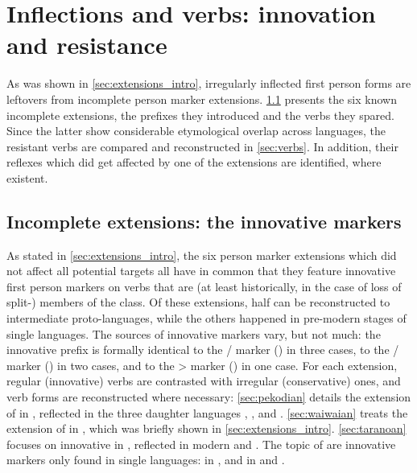 \section{Inflections and verbs: innovation and resistance}
\label{sec:data}
As was shown in \cref{sec:extensions_intro}, irregularly inflected first person forms are leftovers from incomplete person marker extensions.
\cref{sec:extensions} presents the six known incomplete extensions, the prefixes they introduced and the verbs they spared.
Since the latter show considerable etymological overlap across languages, the resistant verbs are compared and reconstructed in \cref{sec:verbs}.
In addition, their reflexes which did get affected by one of the extensions are identified, where existent.

\subsection{Incomplete extensions: the innovative \texorpdfstring{}{Sa} markers}
\label{sec:extensions}
As stated in \cref{sec:extensions_intro}, the six person marker extensions which did not affect all potential targets all have in common that they feature innovative first person markers on verbs that are (at least historically, in the case of loss of split-) members of the  class.
Of these extensions, half can be reconstructed to intermediate proto-languages, while the others happened in pre-modern stages of single languages.
The sources of innovative markers vary, but not much: the innovative  prefix is formally identical to the / marker (\PC {}) in three cases, to the / marker (\PC {}) in two cases, and to the > marker (\PC {}) in one case.
For each extension, regular (innovative) verbs are contrasted with irregular (conservative) ones, and verb forms are reconstructed where necessary:
\cref{sec:pekodian} details the extension of  in \PPek, reflected in the three daughter languages \arara, \ikpeng, and \bakairi.
\cref{sec:waiwaian} treats the extension of  in \PWai, which was briefly shown in \cref{sec:extensions_intro}.
\cref{sec:taranoan} focuses on innovative  in \PTir, reflected in modern \trio and \akuriyo.
The topic of  are innovative  markers only found in single languages:
 in \akuriyo, and  in \carijo and \yukpa.
 
